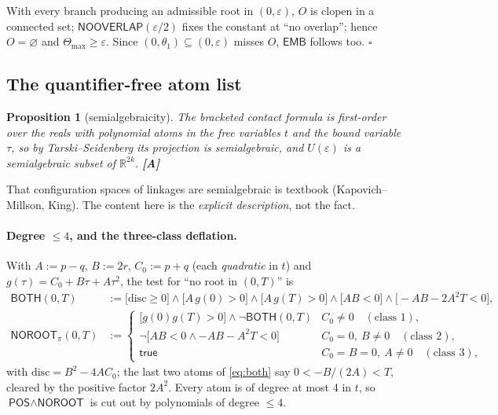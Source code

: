 \documentclass[11pt,a4paper]{article}
\newtheorem{proposition}[theorem]{Proposition}
\theoremstyle{definition}
\newcommand{\Tmax}{\Theta_{\max}}
\newcommand{\POS}{\textsf{POS}}
\newcommand{\NOOV}{\textsf{NOOVERLAP}}
\newcommand{\NOROOT}{\textsf{NOROOT}}
\newcommand{\EMB}{\textsf{EMB}}
\begin{document}
\medskip\noindent
With every branch producing an admissible root in $(0,\varepsilon)$, $O$ is clopen in a
connected set; $\NOOV(\varepsilon/2)$ fixes the constant at ``no overlap''; hence
$O=\varnothing$ and $\Tmax\ge\varepsilon$. Since $(0,\theta_1)\subseteq(0,\varepsilon)$
misses $O$, $\EMB$ follows too. \hfill$\square$

\subsection{The quantifier-free atom list}

\begin{proposition}[semialgebraicity]
The bracketed contact formula is first-order over the reals with polynomial atoms in the free
variables $t$ and the bound variable $\tau$, so by Tarski--Seidenberg its projection is
semialgebraic, and $U(\varepsilon)$ is a semialgebraic subset of $\mathbb{R}^{2k}$.
\textbf{[A]}
\end{proposition}

\noindent That configuration spaces of linkages are semialgebraic is textbook
(Kapovich--Millson, King). The content here is the \emph{explicit description}, not the fact.

\paragraph{Degree $\le4$, and the three-class deflation.} With $A:=p-q$, $B:=2r$,
$C_0:=p+q$ (each \emph{quadratic} in $t$) and $g(\tau)=C_0+B\tau+A\tau^2$, the test for ``no
root in $(0,T)$'' is
\begin{align}
\textsf{BOTH}(0,T) &:= \bigl[\mathrm{disc}\ge0\bigr]\wedge\bigl[A\,g(0)>0\bigr]\wedge
\bigl[A\,g(T)>0\bigr]\wedge\bigl[AB<0\bigr]\wedge\bigl[-AB-2A^2T<0\bigr],
\label{eq:both}\\
\NOROOT_\pi(0,T) &:=
\begin{cases}
\bigl[g(0)g(T)>0\bigr]\wedge\neg\textsf{BOTH}(0,T) & C_0\ne0 \quad(\text{class 1}),\\[2pt]
\neg\bigl[AB<0\wedge -AB-A^2T<0\bigr] & C_0=0,\ B\ne0 \quad(\text{class 2}),\\[2pt]
\textsf{true} & C_0=B=0,\ A\ne0 \quad(\text{class 3}),
\end{cases}
\label{eq:noroot}
\end{align}
with $\mathrm{disc}=B^2-4AC_0$; the last two atoms of \eqref{eq:both} say
$0<-B/(2A)<T$, cleared by the positive factor $2A^2$. Every atom is of degree at most 4 in
$t$, so $\POS\wedge\NOROOT$ is cut out by polynomials of degree $\le4$.
\end{document}
